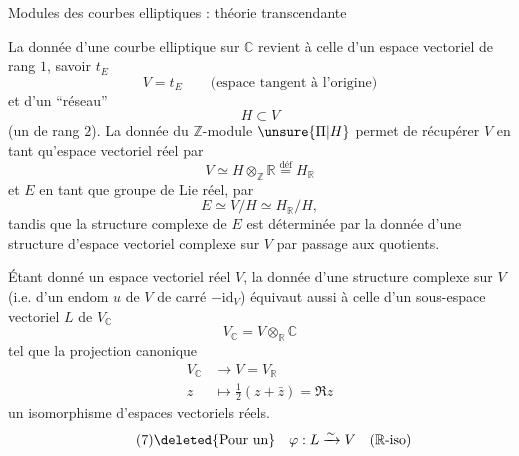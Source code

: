 Modules des courbes elliptiques : théorie transcendante

La donnée d'une courbe elliptique  sur $\mathbb C$ revient à celle  d'un  espace vectoriel de rang $1$, savoir $t_E$
\[
\tag{1}
V=t_E\qquad\text{(espace tangent à l'origine)}
\]
et d'un ``réseau''
\[
\tag{2}
H\subset V
\]
(un     de rang $2$). La donnée du  $\mathbb Z$-module $\unsure{\Pi|H}$ permet de récupérer $V$ en tant qu'espace vectoriel réel  par
\[
\tag{3}
V\simeq H\otimes_{\mathbb Z}\mathbb R\overset{\text{déf}}=H_{\mathbb R}
\]
et $E$ en tant que groupe de Lie réel, par
\[
\tag{4}
E\simeq V/H\simeq H_{\mathbb R}/H,
\]
tandis que la structure complexe de $E$ est déterminée par la donnée d'une structure d'espace vectoriel complexe sur $V$ par passage aux quotients.

Étant donné un espace vectoriel réel $V$,  la donnée d'une structure complexe sur $V$ (i.e. d'un endom $u$ de $V$ de carré $-\mathrm{id}_V$) équivaut aussi à celle d'un sous-espace vectoriel $L$ de $V_{\mathbb C}$
\[
\tag{5}
V_{\mathbb C}=V\otimes_{\mathbb R}\mathbb C
\]
tel que la projection canonique
\[
\tag{6}
\begin{aligned}
V_{\mathbb C}&\longrightarrow V=V_{\mathbb R}\\
z&\longmapsto\tfrac12(z+\bar z)=\Re z
\end{aligned}
\]
  un isomorphisme d'espaces vectoriels réels.
\[
\tag{7}
\deleted{\text{Pour un}}\quad\varphi:L\xrightarrow{\sim}V\quad(\mathbb R\text{-iso})
\]
